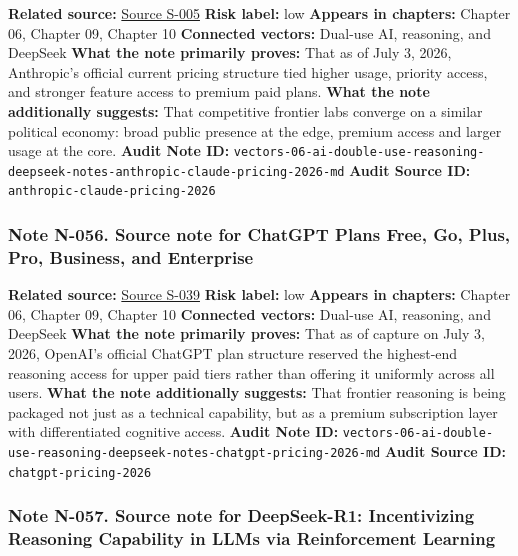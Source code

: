 \documentclass[
  american,
  11pt,
  letterpaper,
]{article}
\begin{document}
\textbf{Related source:}
\hyperref[source-s-005-plans-pricing-claude-by-anthropic]{Source S-005}
\textbf{Risk label:} low \textbf{Appears in chapters:} Chapter 06,
Chapter 09, Chapter 10 \textbf{Connected vectors:} Dual-use AI,
reasoning, and DeepSeek \textbf{What the note primarily proves:} That as
of July 3, 2026, Anthropic's official current pricing structure tied
higher usage, priority access, and stronger feature access to premium
paid plans. \textbf{What the note additionally suggests:} That
competitive frontier labs converge on a similar political economy: broad
public presence at the edge, premium access and larger usage at the
core. \textbf{Audit Note ID:}
\texttt{vectors-06-ai-double-use-reasoning-deepseek-notes-anthropic-claude-pricing-2026-md}
\textbf{Audit Source ID:} \texttt{anthropic-claude-pricing-2026}

\subsubsection{Note N-056. Source note for ChatGPT Plans \textbar{}
Free, Go, Plus, Pro, Business, and
Enterprise}\label{note-n-056-vectors-06-ai-double-use-reasoning-deepseek-notes-chatgpt-pricing-2026-md}

\textbf{Related source:}
\hyperref[source-s-039-chatgpt-plans-free-go-plus-pro-business-and-enterprise]{Source
S-039} \textbf{Risk label:} low \textbf{Appears in chapters:} Chapter
06, Chapter 09, Chapter 10 \textbf{Connected vectors:} Dual-use AI,
reasoning, and DeepSeek \textbf{What the note primarily proves:} That as
of capture on July 3, 2026, OpenAI's official ChatGPT plan structure
reserved the highest-end reasoning access for upper paid tiers rather
than offering it uniformly across all users. \textbf{What the note
additionally suggests:} That frontier reasoning is being packaged not
just as a technical capability, but as a premium subscription layer with
differentiated cognitive access. \textbf{Audit Note ID:}
\texttt{vectors-06-ai-double-use-reasoning-deepseek-notes-chatgpt-pricing-2026-md}
\textbf{Audit Source ID:} \texttt{chatgpt-pricing-2026}

\subsubsection{Note N-057. Source note for DeepSeek-R1: Incentivizing
Reasoning Capability in LLMs via Reinforcement
Learning}\label{note-n-057-vectors-06-ai-double-use-reasoning-deepseek-notes-deepseek-r1-reinforcement-learning-2025-md}
\end{document}

